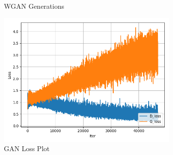 \documentclass[conference]{IEEEtran}
\begin{document}
    \begin{figure}
        \caption{WGAN Generations}
        \label{fig:generation-wgan}
        \centering
    \end{figure}

    \begin{figure}
        \caption{GAN Loss Plot}
        \label{fig:loss-plot-gan}
        \includegraphics[width=9cm]{GAN_loss.png}
        \centering
    \end{figure}
\end{document}
